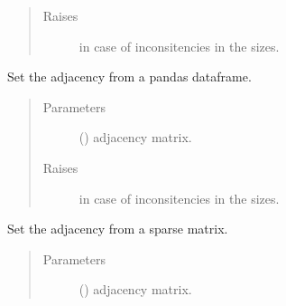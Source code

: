 \documentclass[letterpaper,10pt,english]{sphinxmanual}
\begin{document}
\begin{fulllineitems}
\begin{fulllineitems}
\begin{quote}
\begin{description}
\item[{Raises}] \leavevmode
{} \textendash{} in case of inconsitencies in the sizes.

\end{description}\end{quote}

\end{fulllineitems}


\begin{fulllineitems}
\label{\detokenize{_modules/cosifer.collections:cosifer.collections.graph.Graph.set_adjacency_from_pandas}}
Set the adjacency from a pandas dataframe.
\begin{quote}\begin{description}
\item[{Parameters}] \leavevmode
{} () \textendash{} adjacency matrix.

\item[{Raises}] \leavevmode
{} \textendash{} in case of inconsitencies in the sizes.

\end{description}\end{quote}

\end{fulllineitems}


\begin{fulllineitems}
\label{\detokenize{_modules/cosifer.collections:cosifer.collections.graph.Graph.set_adjacency_from_sparse}}
Set the adjacency from a sparse matrix.
\begin{quote}\begin{description}
\item[{Parameters}] \leavevmode
{} () \textendash{} adjacency matrix.


\end{description}
\end{quote}
\end{fulllineitems}
\end{fulllineitems}
\end{document}
